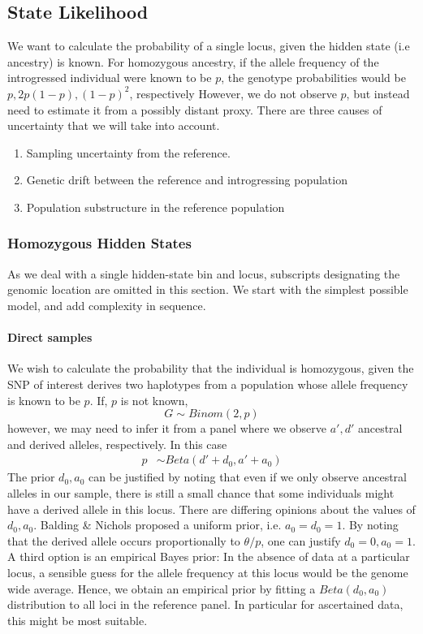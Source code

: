 \documentclass[10pt,a4paper]{article}
\begin{document}
\subsection{State Likelihood}
We want to calculate the probability of a single locus, given the hidden state (i.e ancestry) is known. For homozygous ancestry, if the allele frequency of the introgressed individual were known to be $p$, the genotype probabilities would be $p, 2p(1-p), (1-p)^2$, respectively However, we do not observe $p$, but instead need  to estimate it from a possibly distant proxy. There are three causes of uncertainty that we will take into account.
\begin{enumerate}
	\item Sampling uncertainty from the reference.	
	\item Genetic drift between the reference and introgressing population
	\item Population substructure in the reference population
\end{enumerate}


\subsubsection{Homozygous Hidden States}
As we deal with a single hidden-state bin and locus, subscripts designating the genomic location are omitted in this section. We start with the simplest possible model, and add complexity in sequence.
\paragraph{Direct samples}
We wish to calculate the probability that the individual is homozygous, given the SNP of interest derives two haplotypes from a population whose allele frequency is known to be $p$. If, $p$ is not known, 
\begin{equation}
G \sim Binom(2, p)
\end{equation}
however, we may need to infer it from a panel where we observe $a', d'$ ancestral and derived alleles, respectively. In this case
\begin{align}
p &\sim Beta(d' + d_0, a' + a_0)
\end{align}
The prior $d_0, a_0$ can be justified by noting that even if we only observe ancestral alleles in our sample, there is still a small chance that some individuals might have a derived allele in this locus. There are differing opinions about the values of $d_0, a_0$. Balding \& Nichols proposed a uniform prior, i.e. $a_0=d_0=1$. By noting that the derived allele occurs proportionally to $\theta/p$, one can justify $d_0=0, a_0=1$. A third option is an empirical Bayes prior: In the absence of data at a particular locus, a sensible guess for the allele frequency at this locus would be the genome wide average. Hence, we obtain an empirical prior by fitting a $Beta(d_0, a_0)$ distribution to all loci in the reference panel. In particular for ascertained data, this might be most suitable.
\end{document}
